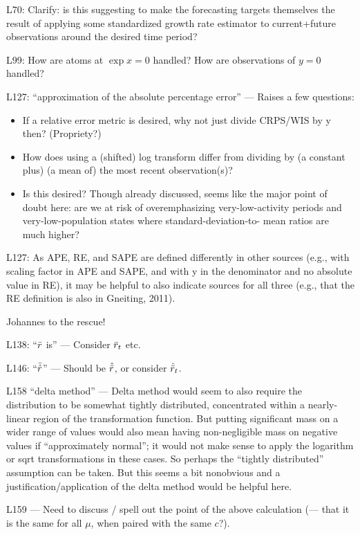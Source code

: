 \documentclass{article}
\newcommand{\red}{\color{red}}
\newcommand{\black}{\color{black}}
\begin{document}
\red
L70: Clarify: is this suggesting to make the forecasting targets themselves the result of applying some standardized growth rate estimator to current+future observations around the desired time period?

L99: How are atoms at $\exp x = 0$ handled? How are observations of $y = 0$ handled?

L127: “approximation of the absolute percentage error” — Raises a few questions:
\begin{itemize}
    \item If a relative error metric is desired, why not just divide CRPS/WIS by y then? (Propriety?)
    \item How does using a (shifted) log transform differ from dividing by (a constant plus) (a mean of) the most recent observation(s)?
    \item Is this desired? Though already discussed, seems like the major point of doubt here: are we at risk of overemphasizing very-low-activity periods and very-low-population states where standard-deviation-to- mean ratios are much higher?
\end{itemize}

L127: As APE, RE, and SAPE are defined differently in other sources (e.g., with scaling factor in APE and SAPE, and with y in the denominator and no absolute value in RE), it may be helpful to also indicate sources for all three (e.g., that the RE definition is also in Gneiting, 2011).

\black
Johannes to the rescue! 

\red

L138: “$\Bar{r}$ is” — Consider $\Bar{r}_t$ etc.

L146: “$\Bar{\hat{r}}$” — Should be $\hat{\Bar{r}}$, or consider $\hat{\Bar{r}}_t$.

L158 “delta method” — Delta method would seem to also require the distribution to be somewhat tightly distributed, concentrated within a nearly-linear region of the transformation function. But putting significant mass on a wider range of values would also mean having non-negligible mass on negative values if “approximately normal”; it would not make sense to apply the logarithm or sqrt transformations in these cases. So perhaps the “tightly distributed” assumption can be taken. But this seems a bit nonobvious and a justification/application of the delta method would be helpful here.

L159 — Need to discuss / spell out the point of the above calculation (— that it is the same for all $\mu$, when paired with the same $c$?).
\end{document}
